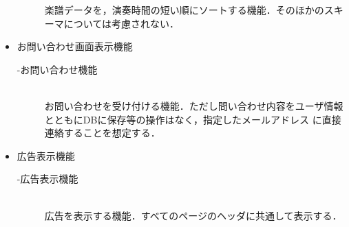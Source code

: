 \begin{itemize}
\begin{description}
                  楽譜データを，演奏時間の短い順にソートする機能．そのほかのスキーマについては考慮されない．
          \end{description}
    \item お問い合わせ画面表示機能
          \begin{description}
              \item[-お問い合わせ機能]\mbox{}\\
              お問い合わせを受け付ける機能．ただし問い合わせ内容をユーザ情報とともにDBに保存等の操作はなく，指定したメールアドレス
              に直接連絡することを想定する．
          \end{description}
    \item 広告表示機能
          \begin{description}
              \item[-広告表示機能]\mbox{}\\
              広告を表示する機能．すべてのページのヘッダに共通して表示する．
          \end{description}
\end{itemize}

\clearpage


